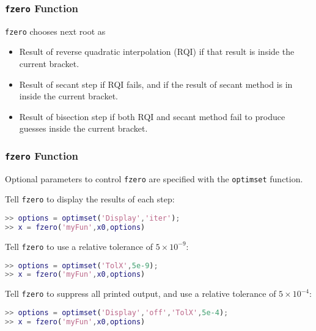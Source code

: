 \documentclass[10pt]{beamer}
\begin{document}
\begin{frame}
\frametitle{\texttt{fzero} Function}

\texttt{fzero} chooses next root as
\begin{itemize}
    \item   Result of reverse quadratic interpolation (RQI) if that result
            is inside the current bracket.
    \item   Result of secant step if RQI fails, and if the result of secant
            method is in inside the current bracket.
    \item   Result of bisection step if both RQI and secant method fail
            to produce guesses inside the current bracket.
\end{itemize}

\end{frame}
\begin{frame}[fragile]
\frametitle{\texttt{fzero} Function}

Optional parameters to control \texttt{fzero} are specified with
the \texttt{optimset} function.

\bigskip
Tell \texttt{fzero} to display the results of each step:
\vspace{0.0cm}
\begin{lstlisting}[language=matlab]
>> options = optimset('Display','iter');
>> x = fzero('myFun',x0,options)
\end{lstlisting}

\vspace{3ex}

Tell \texttt{fzero} to use a relative tolerance of $5\times10^{-9}$:
\vspace{0.0cm}
\begin{lstlisting}[language=matlab]
>> options = optimset('TolX',5e-9);
>> x = fzero('myFun',x0,options)
\end{lstlisting}

\vspace{3ex}

Tell \texttt{fzero} to suppress all printed output, and
use a relative tolerance of $5\times10^{-4}$:
\vspace{0.0cm}
\begin{lstlisting}[language=matlab]
>> options = optimset('Display','off','TolX',5e-4);
>> x = fzero('myFun',x0,options)
\end{lstlisting}

\end{frame}
\end{document}
